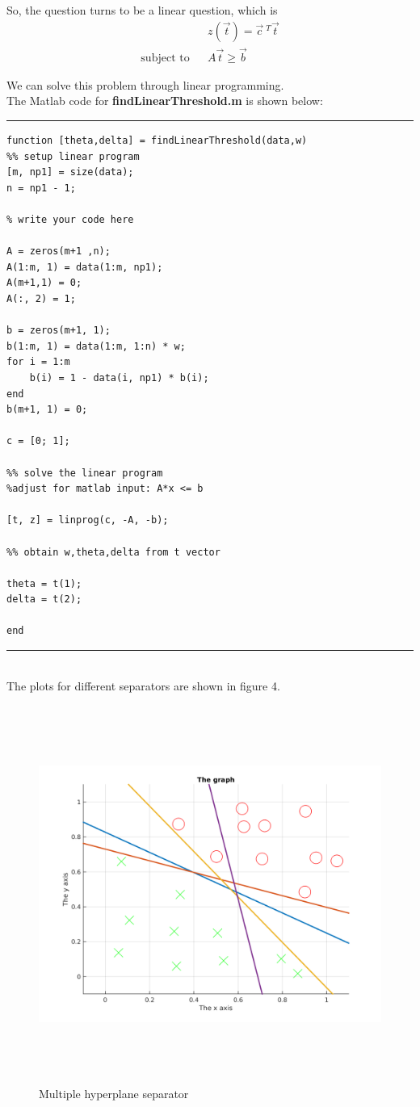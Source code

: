 \begin{enumerate}
\begin{enumerate}
\begin{enumerate}
So, the question turns to be a linear question, which is 
\begin{eqnarray*}
  & & z(\vec{t}) = \vec{c}~^T \vec{t} \\
\textrm{subject to} & & A \vec{t} \geq \vec{b}
\end{eqnarray*}

We can solve this problem through linear programming.\\

The Matlab code for {\bf findLinearThreshold.m} is shown below:\\

\rule{400pt}{2pt}
\begin{lstlisting}
function [theta,delta] = findLinearThreshold(data,w)
%% setup linear program
[m, np1] = size(data);
n = np1 - 1;

% write your code here

A = zeros(m+1 ,n);
A(1:m, 1) = data(1:m, np1);
A(m+1,1) = 0;
A(:, 2) = 1;

b = zeros(m+1, 1);
b(1:m, 1) = data(1:m, 1:n) * w;
for i = 1:m
    b(i) = 1 - data(i, np1) * b(i);
end
b(m+1, 1) = 0;

c = [0; 1];

%% solve the linear program
%adjust for matlab input: A*x <= b

[t, z] = linprog(c, -A, -b);

%% obtain w,theta,delta from t vector

theta = t(1);
delta = t(2);

end
\end{lstlisting}
\rule{400pt}{2pt}\\

The plots for different separators are shown in figure 4.\\

\begin{figure}[h]
\centering
\includegraphics[height = 350pt]{multiple.png}
\caption{Multiple hyperplane separator}
\end{figure}


\end{enumerate}
\end{enumerate}
\end{enumerate}
